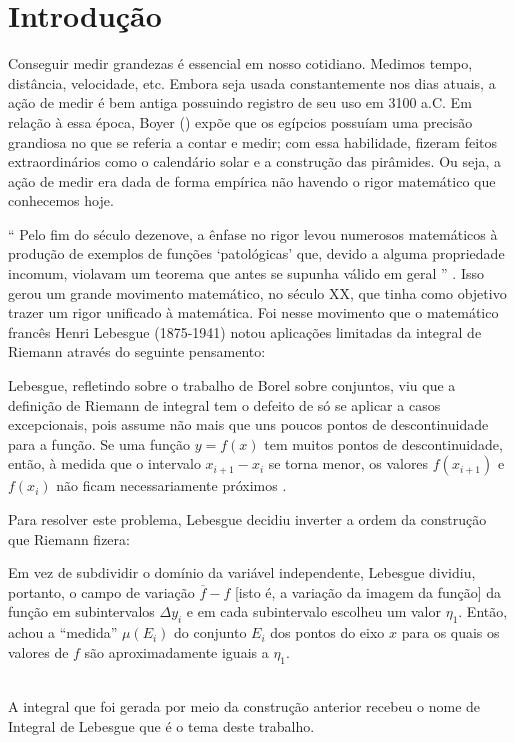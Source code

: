 \chapter{Introdução}
\label{chap:intro}
    Conseguir medir grandezas é essencial em nosso cotidiano.
    Medimos tempo, distância, velocidade, etc.
    Embora seja usada constantemente nos dias atuais, a ação de medir é bem antiga possuindo registro de seu uso em 3100 a.C.
    Em relação à essa época, Boyer (\citeyear{boy}) expõe que os egípcios possuíam uma precisão grandiosa no que se referia a contar e medir;
    com essa habilidade, fizeram feitos extraordinários como o calendário solar e a construção das pirâmides.
    Ou seja, a ação de medir era dada de forma empírica não havendo o rigor matemático que conhecemos hoje.
   
    \enquote{%
    	Pelo fim do século dezenove, a ênfase no rigor levou numerosos matemáticos à produção de exemplos de funções `patológicas' que, devido a alguma propriedade incomum, violavam um teorema que antes se supunha válido em geral%
    } \cite[p. 415]{boy}.
    Isso gerou um grande movimento matemático, no século XX, que tinha como objetivo trazer um rigor unificado à matemática.
    Foi nesse movimento que o matemático francês Henri Lebesgue (1875-1941) notou aplicações limitadas da integral de Riemann através do seguinte pensamento:
    
    \begin{citlon}
    	Lebesgue, refletindo sobre o trabalho de Borel sobre conjuntos, viu que a definição de Riemann de integral tem o defeito de só se aplicar a casos
    	excepcionais, pois assume não mais que uns poucos pontos de descontinuidade para a função.
    	Se uma função $y = f(x)$ tem muitos pontos de descontinuidade, então, à medida que o intervalo $x_{i+1} - x_i$
    	se torna menor, os valores $f(x_{i+1})$ e $f(x_i)$ não ficam
    	necessariamente próximos \cite[p. 416]{boy}.  	
    \end{citlon}

    Para resolver este problema, Lebesgue decidiu inverter a ordem da construção que Riemann fizera:
    
    \begin{citlon}
    	Em vez de subdividir o domínio da variável independente, Lebesgue dividiu, portanto, o campo de variação $\overline{f} - f$ [isto é, a variação da imagem da função]
    	da função em subintervalos $\Delta y_i$ e em cada subintervalo
    	escolheu um valor $\eta_1$. 
    	Então, achou a \enquote{medida} $\mu(E_i)$ do conjunto $E_i$ dos pontos do eixo $x$ para os
    	quais os valores de $f$ são aproximadamente iguais a $\eta_1$\cite[p. 416]{boy}.
    \end{citlon}\\
    A integral que foi gerada por meio da construção anterior recebeu o nome de Integral de Lebesgue que é o tema deste trabalho.
    
